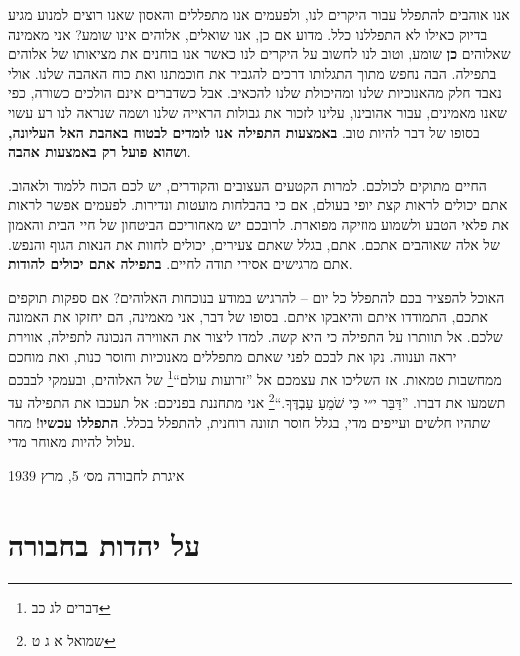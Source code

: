 \documentclass[14pt, article, extrafontsizes, twopage, a4paper]{memoir}
\newcommand{\attr}[1]{
{\raggedright\smaller#1}
}
\begin{document}
אנו אוהבים להתפלל עבור היקרים לנו, ולפעמים אנו מתפללים והאסון שאנו רוצים למנוע מגיע בדיוק כאילו לא התפללנו כלל. מדוע אם כן, אנו שואלים, אלוהים אינו שומע? אני מאמינה שאלוהים \textbf {כן} שומע, וטוב לנו לחשוב על היקרים לנו כאשר אנו בוחנים את מציאותו של אלוהים בתפילה. הבה נחפש מתוך התגלותו דרכים להגביר את חוכמתנו ואת כוח האהבה שלנו. אולי נאבד חלק מהאנוכיות שלנו ומהיכולת שלנו להכאיב. אבל כשדברים אינם הולכים כשורה, כפי שאנו מאמינים, עבור אהובינו, עלינו לזכור את גבולות הראייה שלנו ושמה שנראה לנו רע עשוי בסופו של דבר להיות טוב. \textbf{באמצעות התפילה אנו לומדים לבטוח באהבת האל העליונה, ושהוא פועל רק באמצעות אהבה}.

החיים מתוקים לכולכם. למרות הקטעים העצובים והקודרים, יש לכם הכוח ללמוד ולאהוב. אתם יכולים לראות קצת יופי בעולם, אם כי בהבלחות מועטות ונדירות. לפעמים אפשר לראות את פלאי הטבע ולשמוע מוזיקה מפוארת. לרובכם יש מאחוריכם הביטחון של חיי הבית והאמון של אלה שאוהבים אתכם. אתם, בגלל שאתם צעירים, יכולים לחוות את הנאות הגוף והנפש. אתם מרגישים אסירי תודה לחיים. \textbf{בתפילה אתם יכולים להודות}.

האוכל להפציר בכם להתפלל כל יום -- להרגיש במודע בנוכחות האלוהים? אם ספקות תוקפים אתכם, התמודדו איתם והיאבקו איתם. בסופו של דבר, אני מאמינה, הם יחזקו את האמונה שלכם. אל תוותרו על התפילה כי היא קשה. למדו ליצור את האווירה הנכונה לתפילה, אווירת יראה וענווה. נקו את לבכם לפני שאתם מתפללים מאנוכיות וחוסר כנות, ואת מוחכם ממחשבות טמאות. אז השליכו את עצמכם אל ”זרועות עולם“\footnote{דברים לג כב} של האלוהים, ובעמקי לבבכם תשמעו את דברו. ”דַּבֵּר י״י כִּי שֹׁמֵעַ עַבְדֶּךָ.“\footnote{שמואל א ג ט} אני מתחננת בפניכם: אל תעכבו את התפילה עד שתהיו חלשים ועייפים מדי, בגלל חוסר תזונה רוחנית, להתפלל בכלל. \textbf{התפללו עכשיו}! מחר עלול להיות מאוחר מדי.

\attr{איגרת לחבורה מס׳ 5, מרץ 1939}

\chapter{על יהדות בחבורה}
\end{document}
